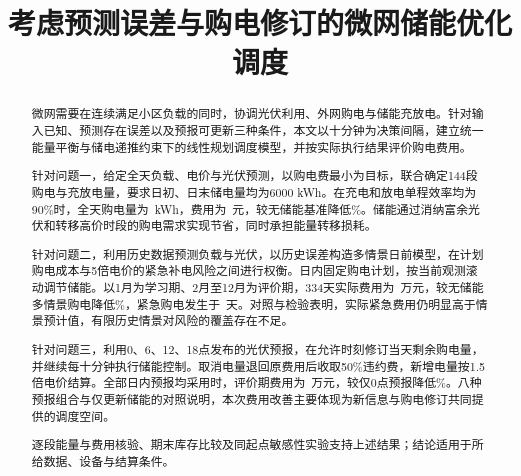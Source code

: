 \documentclass[withoutpreface,notoc,bwprint]{cumcmthesis}
\title{考虑预测误差与购电修订的微网储能优化调度}
\begin{document}
\maketitle
\begin{abstract}
微网需要在连续满足小区负载的同时，协调光伏利用、外网购电与储能充放电。针对输入已知、预测存在误差以及预报可更新三种条件，本文以十分钟为决策间隔，建立统一能量平衡与储电递推约束下的线性规划调度模型，并按实际执行结果评价购电费用。

针对问题一，给定全天负载、电价与光伏预测，以购电费最小为目标，联合确定144段购电与充放电量，要求日初、日末储电量均为6000 kWh。在充电和放电单程效率均为90\%时，全天购电量为\QoneGrid\ kWh，费用为\QoneCost\ 元，较无储能基准降低\SavingPercent\%。储能通过消纳富余光伏和转移高价时段的购电需求实现节省，同时承担能量转移损耗。

针对问题二，利用历史数据预测负载与光伏，以历史误差构造多情景日前模型，在计划购电成本与5倍电价的紧急补电风险之间进行权衡。日内固定购电计划，按当前观测滚动调节储能。以1月为学习期、2月至12月为评价期，334天实际费用为\QtwoCost\ 万元，较无储能多情景购电降低\QtwoNoStorageSaving\%，紧急购电发生于\QtwoDays\ 天。对照与检验表明，实际紧急费用仍明显高于情景预计值，有限历史情景对风险的覆盖存在不足。

针对问题三，利用0、6、12、18点发布的光伏预报，在允许时刻修订当天剩余购电量，并继续每十分钟执行储能控制。取消电量退回原费用后收取50\%违约费，新增电量按1.5倍电价结算。全部日内预报均采用时，评价期费用为\QthreeCost\ 万元，较仅0点预报降低\QthreeSaving\%。八种预报组合与仅更新储能的对照说明，本次费用改善主要体现为新信息与购电修订共同提供的调度空间。

逐段能量与费用核验、期末库存比较及同起点敏感性实验支持上述结果；结论适用于所给数据、设备与结算条件。
\end{abstract}


\FloatBarrier

\FloatBarrier

\FloatBarrier



\end{document}
